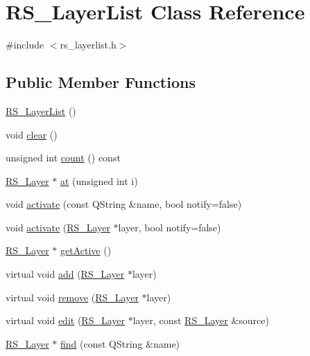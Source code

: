 \hypertarget{classRS__LayerList}{\section{R\-S\-\_\-\-Layer\-List Class Reference}
\label{classRS__LayerList}
}


{\ttfamily \#include $<$rs\-\_\-layerlist.\-h$>$}

\subsection*{Public Member Functions}
\begin{DoxyCompactItemize}
\item 
\hyperlink{classRS__LayerList_aa8ecbfcdcad3c0ae4a22b33307c63690}{R\-S\-\_\-\-Layer\-List} ()
\item 
void \hyperlink{classRS__LayerList_a91fcb5a23d2c0edd5c424bd8b775a6d6}{clear} ()
\item 
unsigned int \hyperlink{classRS__LayerList_a0d5ab806563c6f7b237fb7ce84b29089}{count} () const 
\item 
\hyperlink{classRS__Layer}{R\-S\-\_\-\-Layer} $\ast$ \hyperlink{classRS__LayerList_a75a83b2f18b721257ef6a48bbda0ee58}{at} (unsigned int i)
\item 
void \hyperlink{classRS__LayerList_acc07e798bb62272b37a2e788039f1788}{activate} (const Q\-String \&name, bool notify=false)
\item 
void \hyperlink{classRS__LayerList_ab0c03774955839b3f822e9b9ce3ae6a6}{activate} (\hyperlink{classRS__Layer}{R\-S\-\_\-\-Layer} $\ast$layer, bool notify=false)
\item 
\hyperlink{classRS__Layer}{R\-S\-\_\-\-Layer} $\ast$ \hyperlink{classRS__LayerList_abbe307b9c8fb8e020a0ac5b44ebf33cd}{get\-Active} ()
\item 
virtual void \hyperlink{classRS__LayerList_a072b23bf6f1cc447c0384092e7abac06}{add} (\hyperlink{classRS__Layer}{R\-S\-\_\-\-Layer} $\ast$layer)
\item 
virtual void \hyperlink{classRS__LayerList_aaabe5b4545cb210a64f972e98b8d5f64}{remove} (\hyperlink{classRS__Layer}{R\-S\-\_\-\-Layer} $\ast$layer)
\item 
virtual void \hyperlink{classRS__LayerList_ab5f528027d14211040afbe78f6a3b4a4}{edit} (\hyperlink{classRS__Layer}{R\-S\-\_\-\-Layer} $\ast$layer, const \hyperlink{classRS__Layer}{R\-S\-\_\-\-Layer} \&source)
\item 
\hyperlink{classRS__Layer}{R\-S\-\_\-\-Layer} $\ast$ \hyperlink{classRS__LayerList_a290e473b0d829d0f0dd7748153d4d909}{find} (const Q\-String \&name)

\end{DoxyCompactItemize}
